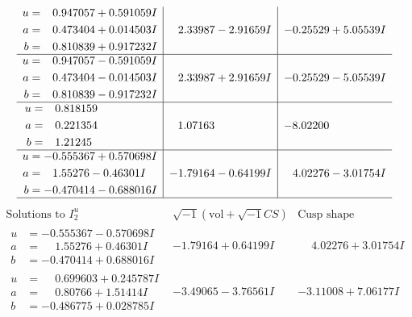 \documentclass[1p]{elsarticle_modified}
\theoremstyle{definition}
\newcommand{\I}{\sqrt{-1}}
\begin{document}
$$\begin{array}{c|c|c}
\begin{aligned}
u &= \phantom{-}0.947057 + 0.591059 I \\
a &= \phantom{-}0.473404 + 0.014503 I \\
b &= \phantom{-}0.810839 + 0.917232 I\end{aligned}
 & \phantom{-}2.33987 - 2.91659 I & -0.25529 + 5.05539 I \\ \hline\begin{aligned}
u &= \phantom{-}0.947057 - 0.591059 I \\
a &= \phantom{-}0.473404 - 0.014503 I \\
b &= \phantom{-}0.810839 - 0.917232 I\end{aligned}
 & \phantom{-}2.33987 + 2.91659 I & -0.25529 - 5.05539 I \\ \hline\begin{aligned}
u &= \phantom{-}0.818159\phantom{ +0.000000I} \\
a &= \phantom{-}0.221354\phantom{ +0.000000I} \\
b &= \phantom{-}1.21245\phantom{ +0.000000I}\end{aligned}
 & \phantom{-}1.07163\phantom{ +0.000000I} & -8.02200\phantom{ +0.000000I} \\ \hline\begin{aligned}
u &= -0.555367 + 0.570698 I \\
a &= \phantom{-}1.55276 - 0.46301 I \\
b &= -0.470414 - 0.688016 I\end{aligned}
 & -1.79164 - 0.64199 I & \phantom{-}4.02276 - 3.01754 I\\
 \hline 
 \end{array}$$\newpage$$\begin{array}{c|c|c}  
\text{Solutions to }I^u_{2}& \I (\text{vol} + \sqrt{-1}CS) & \text{Cusp shape}\\
 \hline 
\begin{aligned}
u &= -0.555367 - 0.570698 I \\
a &= \phantom{-}1.55276 + 0.46301 I \\
b &= -0.470414 + 0.688016 I\end{aligned}
 & -1.79164 + 0.64199 I & \phantom{-}4.02276 + 3.01754 I \\ \hline\begin{aligned}
u &= \phantom{-}0.699603 + 0.245787 I \\
a &= \phantom{-}0.80766 + 1.51414 I \\
b &= -0.486775 + 0.028785 I\end{aligned}
 & -3.49065 - 3.76561 I & -3.11008 + 7.06177 I \\ \hline\begin{aligned}

\end{aligned}
\end{array}$$
\end{document}
